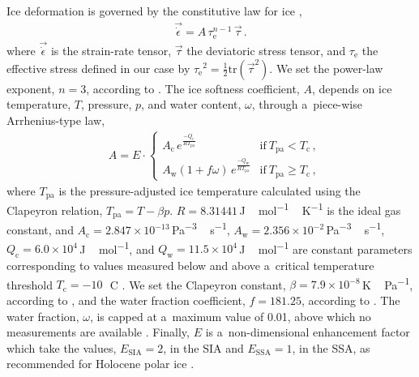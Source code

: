 \documentclass[tc, manuscript]{copernicus}
\begin{document}
    Ice deformation is governed by the constitutive law for ice
    \citep{Glen.1952, Nye.1953},
    \begin{align}
      \vec{\dot{\epsilon}} = A\,\tau_{\mathrm{e}}^{n-1}\,\vec{\tau} \,.
    \end{align}
    where $\vec{\dot{\epsilon}}$ is the strain-rate tensor, $\vec{\tau}$ the
    deviatoric stress tensor, and $\tau_{\mathrm{e}}$ the effective stress
    defined in our case by
    ${\tau_{\mathrm{e}}}^2=\frac{1}{2}\mathrm{tr}(\vec{\tau}^2)$. We set the
    power-law exponent, $n=3$, according to
    \citet[p.~55--57]{Cuffey.Paterson.2010}. The ice
    softness coefficient, $A$, depends on ice temperature, $T$, pressure, $p$,
    and water content, $\omega$, through a~piece-wise Arrhenius-type law,
    \begin{align}
    &A = E\cdot
      \begin{cases}
        A_{\mathrm{c}} \,e^\frac{-Q_{\mathrm{c}}}{RT_{\text{pa}}}
            & \text{if}\ T_   {\text{pa}}  <  T_{\mathrm{c}} \,, \\
        A_{\mathrm{w}} (1+f\omega)\,e^\frac{-Q_{\mathrm{w}}}{RT_{\text{pa}}}
            & \text{if}\ T_   {\text{pa}} \ge T_{\mathrm{c}} \,,
      \end{cases}
    \end{align}
    where $T_{\text{pa}}$ is the pressure-adjusted ice temperature calculated
    using the Clapeyron relation, $T_{\text{pa}}=T-{\beta}p$.
    $R=8.31441$\,\unit{J\,mol^{-1}\,K^{-1}} is the ideal gas constant, and
    $A_{\mathrm{c}}=2.847 \times 10^{-13}$\,\unit{Pa^{-3}\,s^{-1}},
    $A_{\mathrm{w}}=2.356 \times 10^{-2}$\,\unit{Pa^{-3}\,s^{-1}},
    $Q_{\mathrm{c}}=6.0 \times 10^4$\,\unit{J\,mol^{-1}}, and
    $Q_{\mathrm{w}}=11.5 \times 10^4$\,\unit{J\,mol^{-1}} are constant parameters
    corresponding to values measured below and above a~critical temperature
    threshold $T_{\mathrm{c}}=-10$\,\unit{{\degree}C}
    \citep[p.~72]{Cuffey.Paterson.2010}. We set the Clapeyron constant,
    $\beta=7.9\times 10^{-8}$\,\unit{K\,Pa^{-1}}, according to
    \citet{Luthi.etal.2002}, and the water fraction coefficient, $f=181.25$,
    according to \citet{Lliboutry.Duval.1985}. The water fraction, $\omega$, is
    capped at a~maximum value of 0.01, above which no measurements are
    available \citep[Eq.~5.7]{Lliboutry.Duval.1985, Greve.1997}. Finally, $E$
    is a~non-dimensional enhancement factor which take the values,
    $E_{\text{SIA}}=2$, in the SIA and $E_{\text{SSA}}=1$, in the SSA, as
    recommended for Holocene polar ice \citep[p.~77]{Cuffey.Paterson.2010}.
\end{document}
